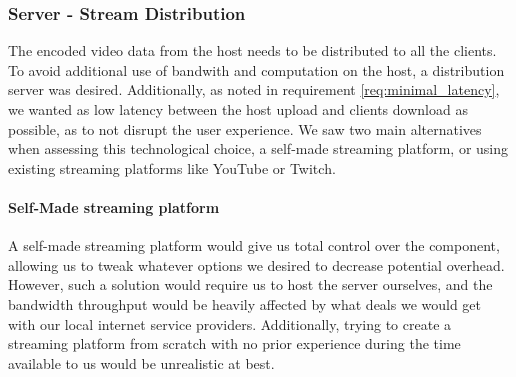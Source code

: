    
    
    
    
    
    
    
    
    
    
    
    
    
    
    

\subsubsection{Server - Stream Distribution} %
The encoded video data from the host needs to be distributed to all the clients. To avoid additional use of bandwith and computation on the host, a distribution server was desired. Additionally, as noted in requirement \ref{req:minimal_latency}, we wanted as low latency between the host upload and clients download as possible, as to not disrupt the user experience. We saw two main alternatives when assessing this technological choice, a self-made streaming platform, or using existing streaming platforms like YouTube or Twitch.

    
\paragraph{Self-Made streaming platform}
A self-made streaming platform would give us total control over the component, allowing us to tweak whatever options we desired to decrease potential overhead. However, such a solution would require us to host the server ourselves, and the bandwidth throughput would be heavily affected by what deals we would get with our local internet service providers. Additionally, trying to create a streaming platform from scratch with no prior experience during the time available to us would be unrealistic at best. 


